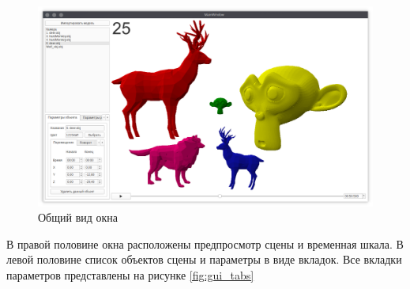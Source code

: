 \begin{figure}[h!]
    \centering
    \includegraphics[width=0.9\columnwidth]{img/gui/common.png}
    \caption{Общий вид окна}
    \label{fig:gui_window}
\end{figure}

В правой половине окна расположены предпросмотр сцены и временная шкала. В левой половине список объектов сцены и параметры в виде вкладок. Все вкладки параметров представлены на рисунке \ref{fig:gui_tabs}

